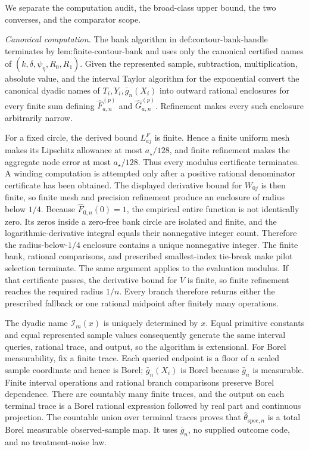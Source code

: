 We separate the computation audit, the broad-class upper bound, the two converses, and the comparator scope.

\emph{Canonical computation.} The bank algorithm in \(\text{def:contour-bank-handle}\) terminates by \(\text{lem:finite-contour-bank}\) and uses only the canonical certified names of \((k,\delta,\psi_{\eta},R_0,R_1)\). Given the represented sample, subtraction, multiplication, absolute value, and the interval Taylor algorithm for the exponential convert the canonical dyadic names of \(T_i,Y_i,\bar g_n(X_i)\) into outward rational enclosures for every finite sum defining \(\widehat F_{a,n}^{(p)}\) and \(\widehat G_{a,n}^{(p)}\). Refinement makes every such enclosure arbitrarily narrow.

For a fixed circle, the derived bound \(L^F_{aj}\) is finite. Hence a finite uniform mesh makes its Lipschitz allowance at most \(a_{\star}/128\), and finite refinement makes the aggregate node error at most \(a_{\star}/128\). Thus every modulus certificate terminates. A winding computation is attempted only after a positive rational denominator certificate has been obtained. The displayed derivative bound for \(W_{0j}\) is then finite, so finite mesh and precision refinement produce an enclosure of radius below \(1/4\). Because \(\widehat F_{0,n}(0)=1\), the empirical entire function is not identically zero. Its zeros inside a zero-free bank circle are isolated and finite, and the logarithmic-derivative integral equals their nonnegative integer count. Therefore the radius-below-\(1/4\) enclosure contains a unique nonnegative integer. The finite bank, rational comparisons, and prescribed smallest-index tie-break make pilot selection terminate. The same argument applies to the evaluation modulus. If that certificate passes, the derivative bound for \(V\) is finite, so finite refinement reaches the required radius \(1/n\). Every branch therefore returns either the prescribed fallback or one rational midpoint after finitely many operations.

The dyadic name \(\mathcal I_m(x)\) is uniquely determined by \(x\). Equal primitive constants and equal represented sample values consequently generate the same interval queries, rational trace, and output, so the algorithm is extensional. For Borel measurability, fix a finite trace. Each queried endpoint is a floor of a scaled sample coordinate and hence is Borel; \(\bar g_n(X_i)\) is Borel because \(\bar g_n\) is measurable. Finite interval operations and rational branch comparisons preserve Borel dependence. There are countably many finite traces, and the output on each terminal trace is a Borel rational expression followed by real part and continuous projection. The countable union over terminal traces proves that \(\widehat\theta_{\mathrm{spec},n}\) is a total Borel measurable observed-sample map. It uses \(\bar g_n\), no supplied outcome code, and no treatment-noise law.

